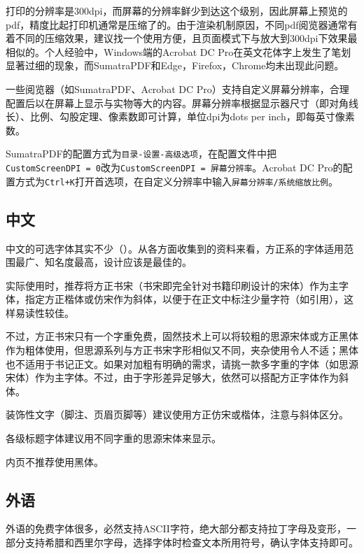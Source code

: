 \documentclass[10pt,openany]{book}
\begin{document}
\begin{sloppypar}
    打印的分辨率是300dpi，而屏幕的分辨率鲜少到达这个级别，因此屏幕上预览的pdf，精度比起打印机通常是压缩了的。由于渲染机制原因，不同pdf阅览器通常有着不同的压缩效果，建议找一个使用方便，且页面模式下与放大到300dpi下效果最相似的。个人经验中，Windows端的Acrobat DC Pro在英文花体字上发生了笔划显著过细的现象，而SumatraPDF和Edge，Firefox，Chrome均未出现此问题。

    一些阅览器（如SumatraPDF、Acrobat DC Pro）支持自定义屏幕分辨率，合理配置后以在屏幕上显示与实物等大的内容。屏幕分辨率根据显示器尺寸（即对角线长）、比例、勾股定理、像素数即可计算，单位dpi为dots per inch，即每英寸像素数。

    SumatraPDF的配置方式为\texttt{目录-设置-高级选项}，在配置文件中把\texttt{CustomScreenDPI\ =\ 0}改为\texttt{CustomScreenDPI\ =\ 屏幕分辨率}。Acrobat DC Pro的配置方式为\texttt{Ctrl+K}打开首选项，在自定义分辨率中输入\texttt{屏幕分辨率/系统缩放比例}。

    \subsection{中文}

    中文的可选字体其实不少（）。从各方面收集到的资料来看，方正系的字体适用范围最广、知名度最高，设计应该是最佳的。

    实际使用时，推荐将方正书宋（书宋即完全针对书籍印刷设计的宋体）作为主字体，指定方正楷体或仿宋作为斜体，以便于在正文中标注少量字符（如引用），这样易读性较佳。

    不过，方正书宋只有一个字重免费，固然技术上可以将较粗的思源宋体或方正黑体作为粗体使用，但思源系列与方正书宋字形相似又不同，夹杂使用令人不适；黑体也不适用于书记正文。如果对加粗有明确的需求，请挑一款多字重的字体（如思源宋体）作为主字体。不过，由于字形差异足够大，依然可以搭配方正字体作为斜体。

    装饰性文字（脚注、页眉页脚等）建议使用方正仿宋或楷体，注意与斜体区分。

    各级标题字体建议用不同字重的思源宋体来显示。

    内页不推荐使用黑体。

    \subsection{外语}

    外语的免费字体很多，必然支持ASCII字符，绝大部分都支持拉丁字母及变形，一部分支持希腊和西里尔字母，选择字体时检查文本所用符号，确认字体支持即可。


\end{sloppypar}
\end{document}
